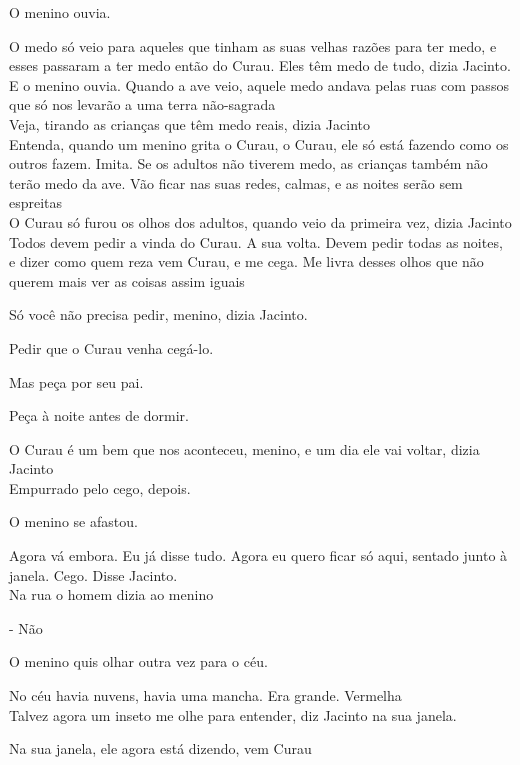 O menino ouvia.

O medo só veio para aqueles que tinham as suas velhas razões para ter
medo, e esses passaram a ter medo então do Curau. Eles têm medo de tudo,
dizia Jacinto. E o menino ouvia. Quando a ave veio, aquele medo andava
pelas ruas com passos que só nos levarão a uma terra não-sagrada\\

Veja, tirando as crianças que têm medo reais, dizia Jacinto\\

Entenda, quando um menino grita o Curau, o Curau, ele só está fazendo
como os outros fazem. Imita. Se os adultos não tiverem medo, as crianças
também não terão medo da ave. Vão ficar nas suas redes, calmas, e as
noites serão sem espreitas\\

O Curau só furou os olhos dos adultos, quando veio da primeira vez,
dizia Jacinto\\

Todos devem pedir a vinda do Curau. A sua volta. Devem pedir todas as
noites, e dizer como quem reza vem Curau, e me cega. Me livra desses
olhos que não querem mais ver as coisas assim iguais

Só você não precisa pedir, menino, dizia Jacinto.

Pedir que o Curau venha cegá-lo.

Mas peça por seu pai.

Peça à noite antes de dormir.

O Curau é um bem que nos aconteceu, menino, e um dia ele vai voltar,
dizia Jacinto\\

Empurrado pelo cego, depois.

O menino se afastou.

Agora vá embora. Eu já disse tudo. Agora eu quero ficar só aqui, sentado
junto à janela. Cego. Disse Jacinto.\\

Na rua o homem dizia ao menino

- Não

O menino quis olhar outra vez para o céu.

No céu havia nuvens, havia uma mancha. Era grande. Vermelha\\

Talvez agora um inseto me olhe para entender, diz Jacinto na sua janela.

Na sua janela, ele agora está dizendo, vem Curau

